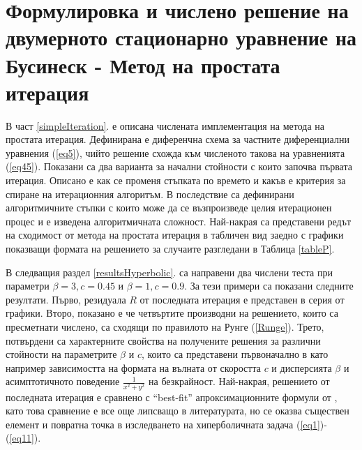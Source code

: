 \documentclass{article}
\newcommand{\rf}[1]{(\ref{#1})}
\theoremstyle{remark}
\begin{document}
\section{Формулировка и числено решение на двумерното стационарно уравнение на Бусинеск - Метод на простата итерация}\label{ellipticFormulation}
В част \ref{simpleIteration}. е описана числената имплементация на метода на простата итерация. Дефинирана е диференчна схема за частните диференциални уравнения \rf{eq5}, чийто решение схожда към численото такова на уравненията \rf{eq45}. Показани са два варианта за начални стойности с които започва първата итерация. Описано е как се променя стъпката по времето и какъв е критерия за спиране на итерационния алгоритъм. В последствие са дефинирани алгоритмичните стъпки с които може да се възпроизведе целия итерационен процес и е изведена алгоритмичната сложност. Най-накрая са представени редът на сходимост от метода на простата итерация в табличен вид заедно с графики показващи формата на решението за случаите разгледани в Таблица \ref{tableP}. 

В следващия раздел \ref{resultsHyperbolic}. са направени два числени теста при параметри $\beta = 3, c=0.45$ и $\beta = 1, c=0.9$. За тези примери са показани следните резултати. Първо, резидуала $R$ от последната итерация е представен в серия от графики. Второ, показано е че четвъртите производни на решението, които са пресметнати числено, са сходящи по правилото на Рунге \rf{Runge}. Трето,  потвърдени са характерните свойства на получените решения за различни стойности на параметрите $\beta$ и $c$, които са представени първоначално в \cite{ref116,Ch2011} като например зависимостта на формата на вълната от скоростта $c$ и дисперсията $\beta$ и асимптотичното поведение $\frac{1}{x^2 + y^2}$ на безкрайност. Най-накрая, решението от последната итерация е сравнено с ``best-fit'' апроксимационните формули от \cite{Ch2011}, като това сравнение е все още липсващо в литературата, но се оказва съществен елемент и повратна точка в изследването на хиперболичната задача \rf{eq1}-\rf{eq11}. 
\end{document}
